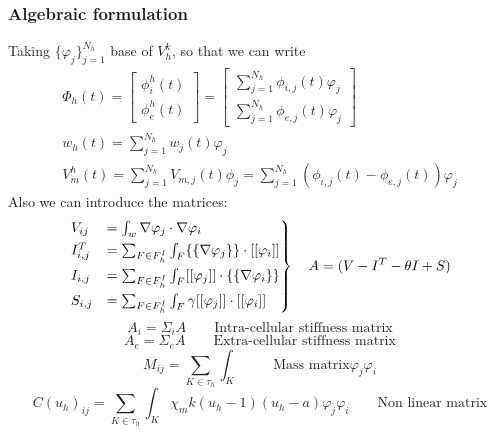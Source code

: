 \documentclass[a4paper,12pt]{article}
\begin{document}
    \subsubsection{Algebraic formulation}
    Taking $\{\varphi_j\}_{j=1}^{N_h}$ base of $V_h^k$, so that we can write
    \begin{equation*}
    \begin{gathered}
    \Phi_h(t) = \begin{bmatrix} \phi_i^h(t) \\ \phi_e^h(t) \end{bmatrix} = \begin {bmatrix}\sum_{j=1}^{N_h} \phi_{i,j}(t)\varphi_j \\ \sum_{j=1}^{N_h} \phi_{e,j}(t)\varphi_j \end{bmatrix}\\
    w_h(t) = \sum_{j=1}^{N_h}w_j(t)\varphi_j\\
    V_m^h(t)=\sum_{j=1}^{N_h} V_{m,j}(t) \phi_j=\sum_{j=1}^{N_h}(\phi_{i,j}(t)-\phi_{e,j}(t))\varphi_j
 \end{gathered}
 \end{equation*}
 Also we can introduce the matrices:
 \begin{equation}
\begin{rcases}
V_{ij} &= \int_{w}\nabla\varphi_j \cdot \nabla \varphi_i 
\\ I_{i,j}^T &= \sum_{F \in F_h^I} \int_{F} \{\{\nabla\varphi_j\}\} \cdot [[\varphi_i]] 
\\ I_{i,j} &= \sum_{F \in F_h^I} \int_{F} [[\varphi_j]] \cdot \{\{\nabla \varphi_i\}\}
\\S_{i,j} &= \sum_{F \in F_h^I} \int_{F} \gamma [[\varphi_j]] \cdot [[\varphi_i]]
\end{rcases}
\begin{gathered}
\quad A = (V -I^T - \theta I + S)\\
\end{gathered}
\end{equation}
\begin{equation}
A_i=\Sigma_i A \qquad{\text{Intra-cellular stiffness matrix}}
\end{equation}
\begin{equation}
A_e=\Sigma_e A \qquad{\text{Extra-cellular stiffness matrix}}
\end{equation}
\begin{equation}
M_{ij} = \sum_{K \in \tau_h}\int_K \qquad{\text{Mass matrix}}
\varphi_j\varphi_i
\end{equation}
\begin{equation}
C(u_h)_{ij} =  \sum_{K \in \tau_h} \int_K \chi_m k(u_h-1)(u_h-a)\varphi_j\varphi_i \qquad{\text{Non linear matrix}}
\end{equation}
\end{document}
